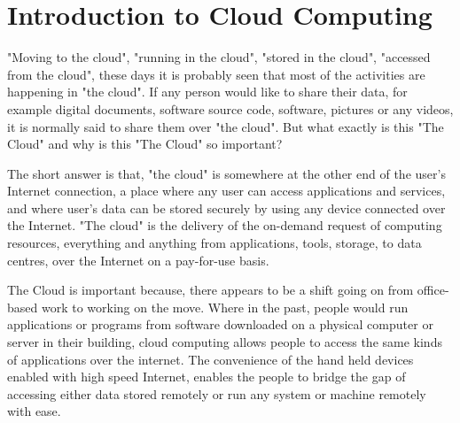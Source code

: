 
\chapter{Introduction to Cloud Computing}\label{ch:introduction_cloud}
\sffamily{}
"Moving to the cloud", "running in the cloud", "stored in the cloud", "accessed from the cloud", these days it is probably seen that most of the activities are happening in "the cloud". If any person would like to share their data, for example digital documents, software source code, software, pictures or any videos, it is normally said to share them over "the cloud". But what exactly is this "The Cloud" and why is this "The Cloud" so important?

The short answer is that, "the cloud" is somewhere at the other end of the user's Internet connection, a place where any user can access applications and services, and where user's data can be stored securely by using any device connected over the Internet. "The cloud" is the delivery of the on-demand request of computing resources, everything and anything from applications, tools, storage, to data centres, over the Internet on a pay-for-use basis.

The Cloud is important because, there appears to be a shift going on from office-based work to working on the move. Where in the past, people would run applications or programs from software downloaded on a physical computer or server in their building, cloud computing allows people to access the same kinds of applications over the internet. The convenience of the hand held devices enabled with high speed Internet, enables the people to bridge the gap of accessing either data stored remotely or run any system or machine remotely with ease.


